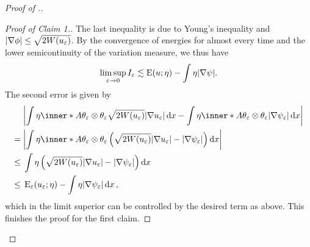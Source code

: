 \begin{proof}[Proof of .]
\begin{proof}[Proof of Claim 1.]
		The last inequality is due to Young's inequality and $ \abs{ \nabla 
			\phi } \leq \sqrt{ 2 W ( u_{ \varepsilon } ) } $.
		By the convergence of energies for almost every time and the lower 
		semicontinuity of the variation measure, we thus have
		\begin{equation*}
			\limsup_{ \varepsilon \to 0 }
			I_{ \varepsilon }
			\lesssim
			\operatorname{E} ( u ; \eta )
			-
			\int
			\eta
			\abs{ \nabla \psi }.
		\end{equation*}
		The second error is given by
		\begin{align*}
			& \abs{
				\int
				\eta
				\inner*{ A }{ \theta_{ \varepsilon } \otimes \theta_{ 
				\varepsilon 
				} }
				\sqrt{ 2 W ( u_{ \varepsilon } ) }
				\abs{ \nabla u_{ \varepsilon } }
				\dd{ x }
				-
				\int
				\eta
				\inner*{ A }{ \theta_{ \varepsilon } \otimes \theta_{ 
				\varepsilon 
				} }
				\abs{ \nabla \psi_{ \varepsilon } }
				\dd{ x }
			}
			\\
			={} &
			\abs{
				\int
				\eta
				\inner*{ A }{ \theta_{ \varepsilon } \otimes \theta_{ 
				\varepsilon 
				} }
				\left(
				\sqrt{ 2 W ( u_{ \varepsilon } ) } \abs{ \nabla u_{ 
						\varepsilon } } 
				-
				\abs{ \nabla \psi_{ \varepsilon } }
				\right)
				\dd{ x }
			}
			\\
			\leq {} &
			\int
			\eta
			\left(
			\sqrt{ 2 W ( u_{ \varepsilon } ) }
			\abs{ \nabla u_{ \varepsilon } }
			-
			\abs{ \nabla \psi_{ \varepsilon } }
			\right)
			\dd{ x }
			\\
			\leq{} &
			\energy_{ \varepsilon } ( u_{ \varepsilon } ; \eta )
			-
			\int
			\eta 
			\abs{ \nabla \psi_{ \varepsilon } }
			\dd{ x },
		\end{align*}
		which in the limit superior can be controlled by the desired term as 
		above. This finishes the proof for the first claim.
	\end{proof}
	

\end{proof}

